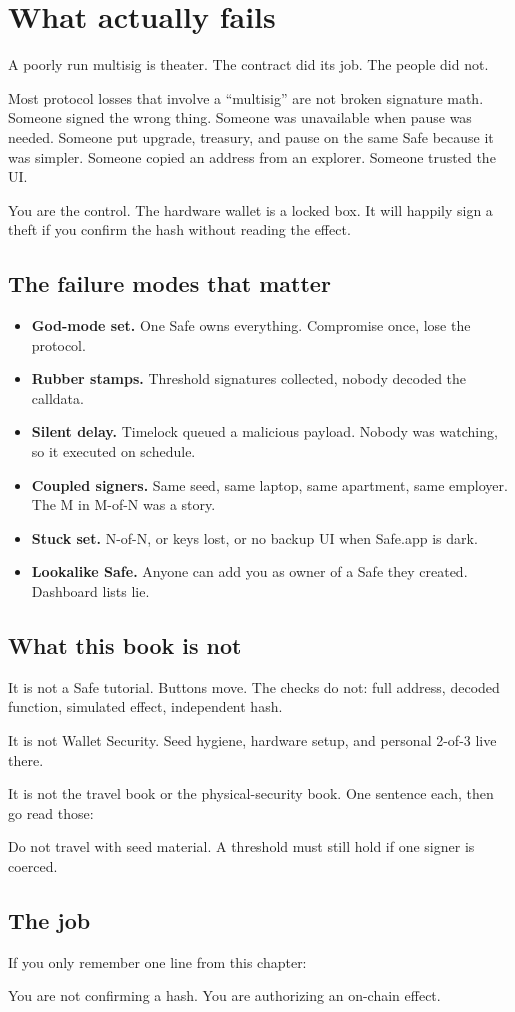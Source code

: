 \chapter{What actually fails}

A poorly run multisig is theater. The contract did its
job. The people did not.

Most protocol losses that involve a ``multisig'' are
not broken signature math. Someone signed the wrong
thing. Someone was unavailable when pause was needed.
Someone put upgrade, treasury, and pause on the same
Safe because it was simpler. Someone copied an address
from an explorer. Someone trusted the UI.

You are the control. The hardware wallet is a locked
box. It will happily sign a theft if you confirm the
hash without reading the effect.

\section{The failure modes that matter}

\begin{itemize}
  \item \textbf{God-mode set.} One Safe owns
  everything. Compromise once, lose the protocol.
  \item \textbf{Rubber stamps.} Threshold signatures
  collected, nobody decoded the calldata.
  \item \textbf{Silent delay.} Timelock queued a
  malicious payload. Nobody was watching, so it
  executed on schedule.
  \item \textbf{Coupled signers.} Same seed, same
  laptop, same apartment, same employer. The M in
  M-of-N was a story.
  \item \textbf{Stuck set.} N-of-N, or keys lost,
  or no backup UI when Safe.app is dark.
  \item \textbf{Lookalike Safe.} Anyone can add you
  as owner of a Safe they created. Dashboard lists
  lie.
\end{itemize}

\section{What this book is not}

It is not a Safe tutorial. Buttons move. The checks
do not: full address, decoded function, simulated
effect, independent hash.

It is not Wallet Security. Seed hygiene, hardware
setup, and personal 2-of-3 live there.

It is not the travel book or the physical-security
book. One sentence each, then go read those:

Do not travel with seed material. A threshold must
still hold if one signer is coerced.

\section{The job}

If you only remember one line from this chapter:

You are not confirming a hash. You are authorizing
an on-chain effect.
